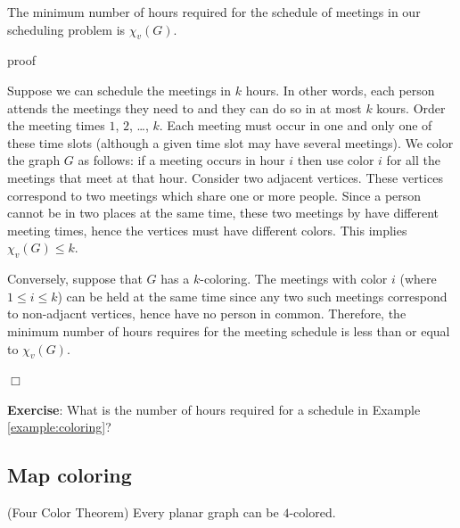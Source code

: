 \begin{theorem}
The minimum number of hours required for the schedule of meetings in
our scheduling problem is $\chi_v(G)$.
\end{theorem}

proof

Suppose we can schedule the meetings in $k$ hours. In other words,
each person attends the meetings they need to and they
can do so in at most $k$ kours. Order the meeting
times $1$, $2$, \dots, $k$. Each meeting must occur in one and only
one of these time slots (although a given time slot may have
several meetings). We color the graph $G$ as follows:
if a meeting occurs in hour $i$ then use color $i$ for all the
meetings that meet at that hour. Consider two adjacent 
vertices. These vertices correspond to two meetings which 
share one or more people. Since a person cannot be in two places at
the same time, these two meetings by have different meeting times,
hence the vertices must have different colors. This implies
$\chi_v(G)\leq k$.

Conversely, suppose that $G$ has a $k$-coloring. 
The meetings with color $i$ (where $1\leq i\leq k$) 
can be held at the same time since any two such meetings
correspond to non-adjacnt vertices, hence have no
person in common. Therefore, the minimum number of 
hours requires for the meeting schedule is less than 
or equal to $\chi_v(G)$.

$\Box$

{\bf Exercise}:
What is the number of hours required for a schedule
in Example \ref{example:coloring}?

\subsection{Map coloring}


\begin{theorem}
(Four Color Theorem)
Every planar graph can be $4$-colored.
\end{theorem}
